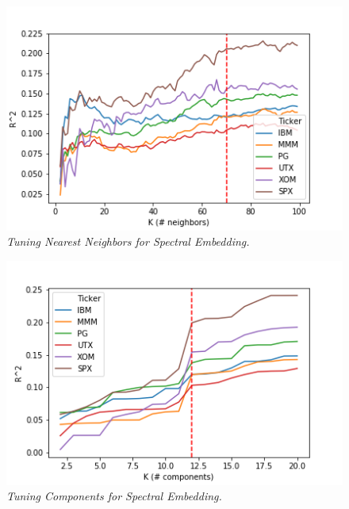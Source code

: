 \documentclass[a4paper]{article}
\begin{document}
    \begin{figure}[t]
    	\centering
    	\includegraphics[width=\linewidth]{spectral_knn_tune.png}
    	\caption{{\it Tuning Nearest Neighbors for Spectral Embedding.}}
    	\label{fig:SpectralKNNTuning}
    \end{figure}
    
    \begin{figure}[t]
    	\centering
    	\includegraphics[width=\linewidth]{spectral_tune.png}
    	\caption{{\it Tuning Components for Spectral Embedding.}}
    	\label{fig:SpectralComponentTuning}
    \end{figure}
    
\end{document}
